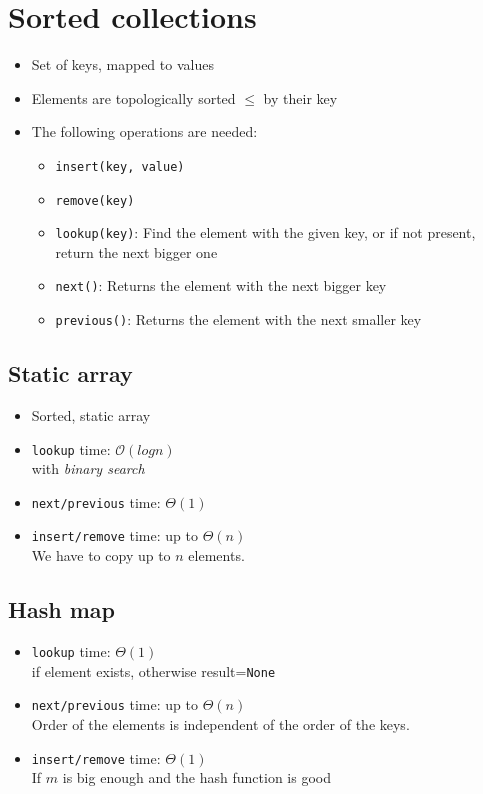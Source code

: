 \documentclass[12pt, a4paper]{scrartcl}
\newcommand{\bigO}{\mathcal{O}}
\begin{document}
\section{Sorted collections}
\label{sec:sorted_collections}
\begin{itemize}
\item Set of keys, mapped to values
\item Elements are topologically sorted $\le$ by their key
\item The following operations are needed:
  \begin{itemize}
  \item \texttt{insert(key, value)}
  \item \texttt{remove(key)}
  \item \texttt{lookup(key)}: Find the element with the given key, or if not present, return the next bigger one
  \item \texttt{next()}: Returns the element with the next bigger key
  \item \texttt{previous()}: Returns the element with the next smaller key
  \end{itemize}
\end{itemize}

\subsection{Static array}
\begin{itemize}
\item Sorted, static array
\item \texttt{lookup} time: $\bigO(log n)$ \\
  with \emph{binary search}
\item \texttt{next/previous} time: $\Theta(1)$
\item \texttt{insert/remove} time: up to $\Theta(n)$ \\
  We have to copy up to $n$ elements.
\end{itemize}

\subsection{Hash map}
\begin{itemize}
\item \texttt{lookup} time: $\Theta(1)$\\
  if element exists, otherwise result=\texttt{None} 
\item \texttt{next/previous} time: up to $\Theta(n)$ \\
  Order of the elements is independent of the order of the keys.
\item \texttt{insert/remove} time: $\Theta(1)$ \\
  If $m$ is big enough and the hash function is good
\end{itemize}
\end{document}
